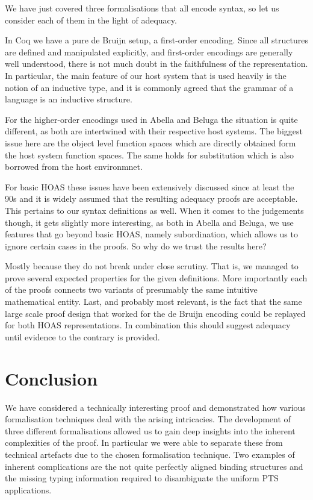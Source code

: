 \documentclass[a4paper,UKenglish]{lipics-v2016}
\theoremstyle{plain}
\begin{document}
We have just covered three formalisations that all encode syntax, so let us consider each of them in the light of adequacy.

In Coq we have a pure de Bruijn setup, a first-order encoding.
Since all structures are defined and manipulated explicitly, and first-order encodings are generally well understood, there is not much doubt in the faithfulness of the representation.
In particular, the main feature of our host system that is used heavily is the notion of an inductive type, and it is commonly agreed that the grammar of a language is an inductive structure.

For the higher-order encodings used in Abella and Beluga the situation is quite different, as both are intertwined with their respective host systems.
The biggest issue here are the object level function spaces which are directly obtained form the host system function spaces.
The same holds for substitution which is also borrowed from the host environmnet.

For basic HOAS these issues have been extensively discussed since at least the 90s and it is widely assumed that the resulting adequacy proofs are acceptable.
This pertains to our syntax definitions as well.
When it comes to the judgements though, it gets slightly more interesting, as both in Abella and Beluga, we use features that go beyond basic HOAS, namely subordination, which allows us to ignore certain cases in the proofs.
So why do we trust the results here?

Mostly because they do not break under close scrutiny.
That is, we managed to prove several expected properties for the given definitions.
More importantly each of the proofs connects two variants of presumably the same intuitive mathematical entity.
Last, and probably most relevant, is the fact that the same large scale proof design that worked for the de Bruijn encoding could be replayed for both HOAS representations.
In combination this should suggest adequacy until evidence to the contrary is provided.

\section{Conclusion}
\label{sec:conclusion}

We have considered a technically interesting proof and demonstrated how various formalisation techniques deal with the arising intricacies.
The development of three different formalisations allowed us to gain deep insights into the inherent complexities of the proof.
In particular we were able to separate these from technical artefacts due to the chosen formalisation technique.
Two examples of inherent complications are the not quite perfectly aligned binding structures and the missing typing information required to disambiguate the uniform PTS applications.
\end{document}
